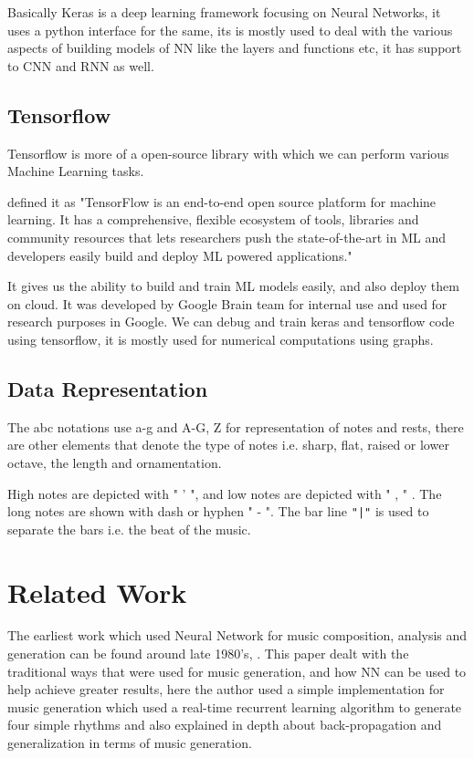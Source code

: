 \documentclass[oneside,12pt]{Classes/RoboticsLaTeX}
\begin{document}
Basically Keras is a deep learning framework focusing on Neural Networks, it uses a python interface for the same, its is mostly used to deal with the various aspects of building models of NN like the layers and functions etc, it has support to CNN and RNN as well.

\section{Tensorflow}

Tensorflow is more of a open-source library with which we can perform various Machine Learning tasks.

\cite{tensorflow} defined it as "TensorFlow is an end-to-end open source platform for machine learning. It has a comprehensive, flexible ecosystem of tools, libraries and community resources that lets researchers push the state-of-the-art in ML and developers easily build and deploy ML powered applications."

It gives us the ability to build and train ML models easily, and also deploy them on cloud. It was developed by Google Brain team for internal use and used for research purposes in Google. We can debug and train keras and tensorflow code using tensorflow, it is mostly used for numerical computations using graphs.

\section{Data Representation}

The abc notations use a-g and A-G, Z for representation of notes and rests, there are other elements that denote the type of notes i.e. sharp, flat, raised or lower octave, the length and ornamentation.

High notes are depicted with " ' ", and low notes are depicted with " , " . The long notes are shown with dash or hyphen " - ". The bar line \verb+"|"+ is used to separate the bars i.e. the beat of the music.



\chapter{Related Work}
\label{chap:rel_work}

The earliest work which used Neural Network for music composition, analysis and generation can be found around late 1980's, \cite{mdolson}. This paper dealt with the traditional ways that were used for music generation, and how NN can be used to help achieve greater results, here the author used a simple implementation for music generation which used a real-time recurrent learning algorithm to generate four simple rhythms and also explained in depth about back-propagation and generalization in terms of music generation. 
\end{document}
